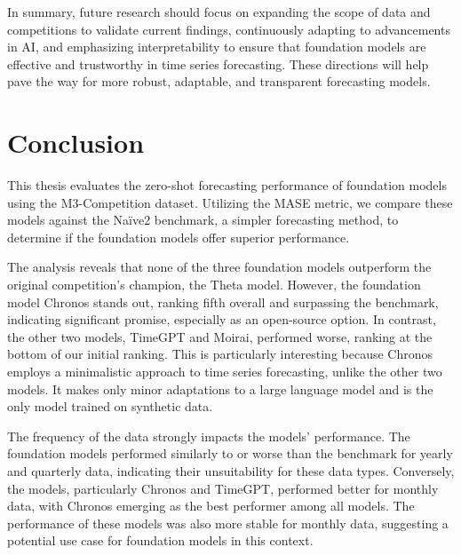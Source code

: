 \documentclass[12pt,a4paper]{article}
\begin{document}
In summary, future research should focus on expanding the scope of data and competitions to validate current findings, continuously adapting to advancements in AI, and emphasizing interpretability to ensure that foundation models are effective and trustworthy in time series forecasting. These directions will help pave the way for more robust, adaptable, and transparent forecasting models.

\newpage
{\centering \section{Conclusion} \par}

This thesis evaluates the zero-shot forecasting performance of foundation models using the M3-Competition dataset. Utilizing the MASE metric, we compare these models against the Naïve2 benchmark, a simpler forecasting method, to determine if the foundation models offer superior performance.

The analysis reveals that none of the three foundation models outperform the original competition's champion, the Theta model. However, the foundation model Chronos stands out, ranking fifth overall and surpassing the benchmark, indicating significant promise, especially as an open-source option. In contrast, the other two models, TimeGPT and Moirai, performed worse, ranking at the bottom of our initial ranking. This is particularly interesting because Chronos employs a minimalistic approach to time series forecasting, unlike the other two models. It makes only minor adaptations to a large language model and is the only model trained on synthetic data.

The frequency of the data strongly impacts the models' performance. The foundation models performed similarly to or worse than the benchmark for yearly and quarterly data, indicating their unsuitability for these data types. Conversely, the models, particularly Chronos and TimeGPT, performed better for monthly data, with Chronos emerging as the best performer among all models. The performance of these models was also more stable for monthly data, suggesting a potential use case for foundation models in this context.
\end{document}
